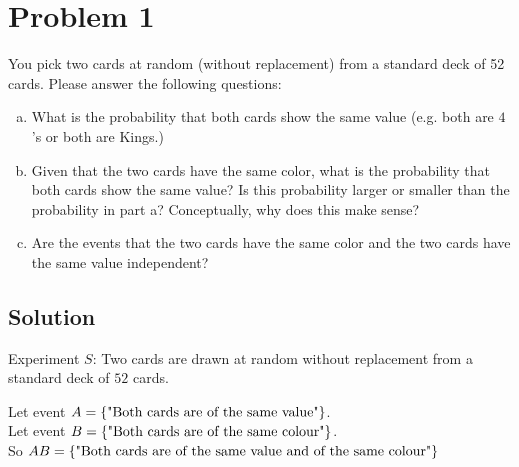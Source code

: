 \section{Problem 1}
 
 You pick two cards at random (without replacement) from a standard deck of 52 cards. Please answer the following questions:
 \begin{enumerate}[a.]
 	\item What is the probability that both cards show the same value (e.g. both are $4$'s or both are Kings.)
 	\item Given that the two cards have the same color, what is the probability that both cards show the same value? Is this probability larger or smaller than the probability in part a? Conceptually, why does this make sense?
 	\item Are the events that the two cards have the same color and the two cards have the same value independent?
 \end{enumerate}
 
\subsection{Solution}

Experiment $S$: Two cards are drawn at random without replacement from a standard deck of $52$ cards.

\noindent Let event $A = \{\text{"Both cards are of the same value"}\}$.\\
\quad Let event $B = \{\text{"Both cards are of the same colour"}\}$.\\
\quad So $AB = \{\text{"Both cards are of the same value and of the same colour"}\}$ 

